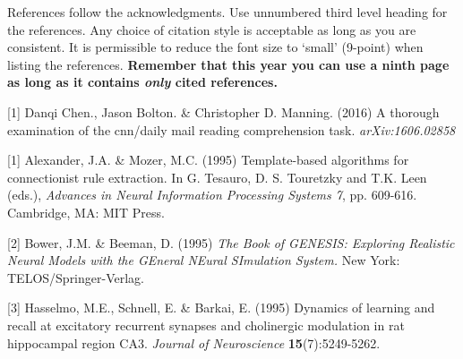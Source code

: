 \documentclass{article} %
\begin{document}
References follow the acknowledgments. Use unnumbered third level heading for
the references. Any choice of citation style is acceptable as long as you are
consistent. It is permissible to reduce the font size to `small' (9-point) 
when listing the references. {\bf Remember that this year you can use
a ninth page as long as it contains \emph{only} cited references.}

\small{
[1] Danqi Chen., Jason Bolton. \& Christopher D. Manning. (2016) A thorough examination of the cnn/daily mail reading comprehension task. {\it arXiv:1606.02858}



[1] Alexander, J.A. \& Mozer, M.C. (1995) Template-based algorithms
for connectionist rule extraction. In G. Tesauro, D. S. Touretzky
and T.K. Leen (eds.), {\it Advances in Neural Information Processing
Systems 7}, pp. 609-616. Cambridge, MA: MIT Press.

[2] Bower, J.M. \& Beeman, D. (1995) {\it The Book of GENESIS: Exploring
Realistic Neural Models with the GEneral NEural SImulation System.}
New York: TELOS/Springer-Verlag.

[3] Hasselmo, M.E., Schnell, E. \& Barkai, E. (1995) Dynamics of learning
and recall at excitatory recurrent synapses and cholinergic modulation
in rat hippocampal region CA3. {\it Journal of Neuroscience}
{\bf 15}(7):5249-5262.
}
\end{document}
